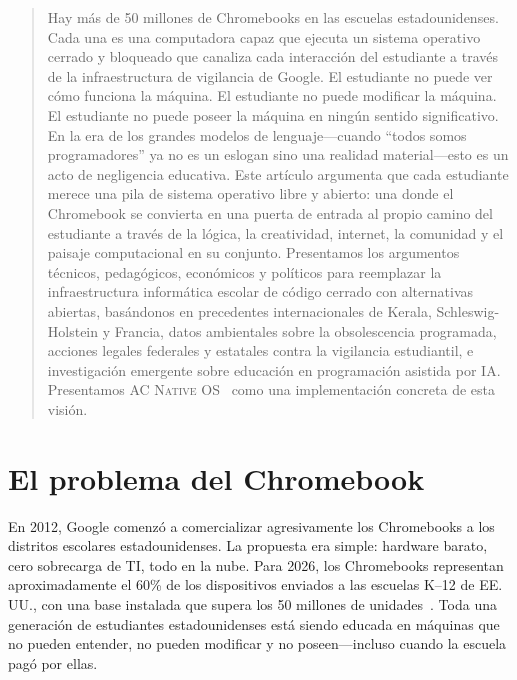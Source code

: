 \documentclass[11pt, a4paper]{article}
\newcommand{\acos}{\textsc{AC Native OS}}
\begin{document}
\begin{multicols}{2}


\begin{abstract}
\noindent
Hay más de 50 millones de Chromebooks en las escuelas estadounidenses. Cada una es una computadora capaz que ejecuta un sistema operativo cerrado y bloqueado que canaliza cada interacción del estudiante a través de la infraestructura de vigilancia de Google. El estudiante no puede ver cómo funciona la máquina. El estudiante no puede modificar la máquina. El estudiante no puede poseer la máquina en ningún sentido significativo. En la era de los grandes modelos de lenguaje---cuando ``todos somos programadores'' ya no es un eslogan sino una realidad material---esto es un acto de negligencia educativa. Este artículo argumenta que cada estudiante merece una pila de sistema operativo libre y abierto: una donde el Chromebook se convierta en una puerta de entrada al propio camino del estudiante a través de la lógica, la creatividad, internet, la comunidad y el paisaje computacional en su conjunto. Presentamos los argumentos técnicos, pedagógicos, económicos y políticos para reemplazar la infraestructura informática escolar de código cerrado con alternativas abiertas, basándonos en precedentes internacionales de Kerala, Schleswig-Holstein y Francia, datos ambientales sobre la obsolescencia programada, acciones legales federales y estatales contra la vigilancia estudiantil, e investigación emergente sobre educación en programación asistida por IA. Presentamos \acos{}~\citep{scudder2026acos} como una implementación concreta de esta visión.
\end{abstract}


\section{El problema del Chromebook}

En 2012, Google comenzó a comercializar agresivamente los Chromebooks a los distritos escolares estadounidenses. La propuesta era simple: hardware barato, cero sobrecarga de TI, todo en la nube. Para 2026, los Chromebooks representan aproximadamente el 60\% de los dispositivos enviados a las escuelas K--12 de EE.\,UU., con una base instalada que supera los 50 millones de unidades~\citep{google2024chromeos}. Toda una generación de estudiantes estadounidenses está siendo educada en máquinas que no pueden entender, no pueden modificar y no poseen---incluso cuando la escuela pagó por ellas.


\end{multicols}
\end{document}
